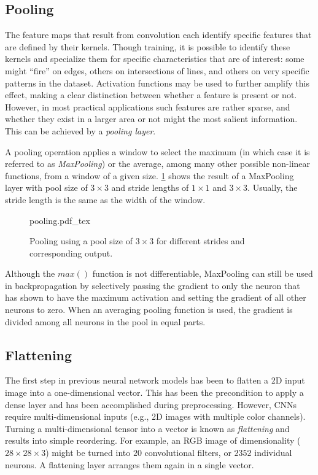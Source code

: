 \subsection{Pooling}

The feature maps that result from convolution each identify specific features that are defined by their kernels.
Though training, it is possible to identify these kernels and specialize them for specific characteristics that are of interest: some might ``fire'' on edges, others on intersections of lines, and others on very specific patterns in the dataset.
Activation functions may be used to further amplify this effect, making a clear distinction between whether a feature is present or not.
However, in most practical applications such features are rather sparse, and whether they exist in a larger area or not might the most salient information. This can be achieved by a \textsl{pooling layer}.

A pooling operation applies a window to select the maximum (in which case it is referred to as \textsl{MaxPooling}) or the average, among many other possible non-linear functions, from a window of a given size. \cref{fig:pooling} shows the result of a MaxPooling layer with pool size of $3\times3$ and stride lengths of $1\times1$ and $3\times3$. Usually, the stride length is the same as the width of the window.

\begin{figure}[htb]
    \centering
    \def\svgwidth{0.8\textwidth}
    {pooling.pdf_tex}
    \caption{Pooling using a pool size of $3\times3$ for different strides and corresponding output.\label{fig:pooling}}
\end{figure}

Although the $max()$ function is not differentiable, MaxPooling can still be used in backpropagation by selectively passing the gradient to only the neuron that has shown to have the maximum activation and setting the gradient of all other neurons to zero. When an averaging pooling function is used, the gradient is divided among all neurons in the pool in equal parts.

\subsection{Flattening}

The first step in previous neural network models has been to flatten a 2D input image into a one-dimensional vector. This has been the precondition to apply a dense layer and has been accomplished during preprocessing.
However, CNNs require multi-dimensional inputs (e.g., 2D images with multiple color channels). Turning a multi-dimensional tensor into a vector is known as \textsl{flattening} and results into simple reordering. For example, an RGB image of dimensionality ($28\times28\times3$) might be turned into $20$ convolutional filters, or $2352$ individual neurons. A flattening layer arranges them again in a single vector.

